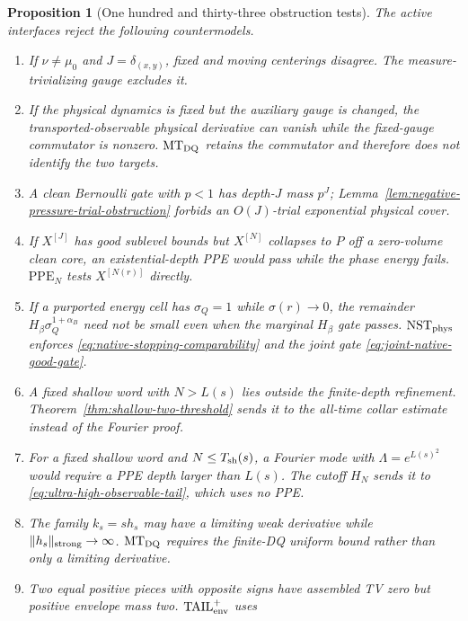 \documentclass[11pt]{article}
\newtheorem{proposition}[theorem]{Proposition}
\begin{document}
\begin{proposition}[One hundred and thirty-three obstruction tests]
\label{prop:v50-obstruction-tests}
The active interfaces reject the following countermodels.
\begin{enumerate}[label=\textup{(T\arabic*)}]
\item If $\nu\ne\mu_0$ and $J=\delta_{(x,y)}$, fixed and moving
      centerings disagree.  The measure-trivializing gauge excludes it.
\item If the physical dynamics is fixed but the auxiliary gauge is changed,
      the transported-observable physical derivative can vanish while the
      fixed-gauge commutator is nonzero.  $\mathrm{MT}_{\rm DQ}$ retains the
      commutator and therefore does not identify the two targets.
\item A clean Bernoulli gate with $p<1$ has depth-$J$ mass $p^J$;
      Lemma~\ref{lem:negative-pressure-trial-obstruction} forbids an
      $O(J)$-trial exponential physical cover.
\item If $X^{[J]}$ has good sublevel bounds but $X^{[N]}$ collapses to $P$
      off a zero-volume clean core, an existential-depth PPE would pass while
      the phase energy fails.  $\mathrm{PPE}_{N}$ tests $X^{[N(r)]}$
      directly.
\item If a purported energy cell has $\sigma_Q=1$ while
      $\sigma(r)\to0$, the remainder
      $H_\beta\sigma_Q^{1+\alpha_B}$ need not be small even when the
      marginal $H_\beta$ gate passes.  $\mathrm{NST}_{\rm phys}$ enforces
      \eqref{eq:native-stopping-comparability} and the joint gate
      \eqref{eq:joint-native-good-gate}.
\item A fixed shallow word with $N>L(s)$ lies outside the finite-depth
      refinement.  Theorem~\ref{thm:shallow-two-threshold} sends it to the
      all-time collar estimate instead of the Fourier proof.
\item For a fixed shallow word and $N\le T_{\rm sh}(s)$, a Fourier mode with
      $\Lambda=e^{L(s)^2}$ would require a PPE depth larger than $L(s)$.
      The cutoff $H_N$ sends it to
      \eqref{eq:ultra-high-observable-tail}, which uses no PPE.
\item The family $k_s=s h_s$ may have a limiting weak derivative while
      $\|h_s\|_{\rm strong}\to\infty$.  $\mathrm{MT}_{\rm DQ}$
      requires the finite-DQ uniform bound rather than only a limiting
      derivative.
\item Two equal positive pieces with opposite signs have assembled TV zero
      but positive envelope mass two.  $\mathrm{TAIL}_{\rm env}^{+}$ uses

\end{enumerate}
\end{proposition}
\end{document}
